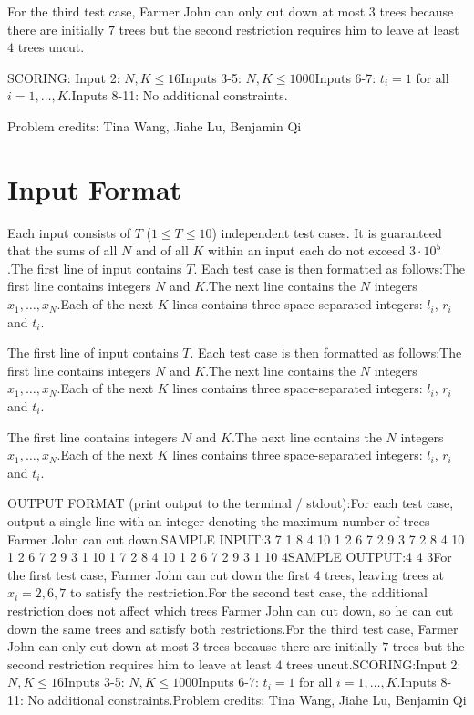 \documentclass[12pt]{article}
\begin{document}
For the third test case, Farmer John can only cut down at most $3$ trees because
there are initially $7$ trees but the second restriction requires him to leave
at least $4$ trees uncut.

SCORING:
Input 2: $N, K \le 16$Inputs 3-5: $N, K \le 1000$Inputs 6-7: $t_i = 1$ for all $i = 1, \dots, K$.Inputs 8-11: No additional constraints.


Problem credits: Tina Wang, Jiahe Lu, Benjamin Qi



\section*{Input Format}
Each input consists of $T$ ($1 \le T \le 10$) independent test cases. It is
guaranteed that the sums of all $N$ and of all $K$ within an input each do not
exceed $3 \cdot 10^5$.The first line of input contains $T$. Each test case is then formatted as
follows:The first line contains integers $N$ and $K$.The next line
contains the $N$ integers $x_1, \dots, x_N$.Each of the next $K$ lines
contains three space-separated integers: $l_i$, $r_i$ and $t_i$.

The first line of input contains $T$. Each test case is then formatted as
follows:The first line contains integers $N$ and $K$.The next line
contains the $N$ integers $x_1, \dots, x_N$.Each of the next $K$ lines
contains three space-separated integers: $l_i$, $r_i$ and $t_i$.

The first line contains integers $N$ and $K$.The next line
contains the $N$ integers $x_1, \dots, x_N$.Each of the next $K$ lines
contains three space-separated integers: $l_i$, $r_i$ and $t_i$.

OUTPUT FORMAT (print output to the terminal / stdout):For each test case, output a single line with an integer denoting the maximum
number of trees Farmer John can cut down.SAMPLE INPUT:3
7 1
8 4 10 1 2 6 7
2 9 3
7 2
8 4 10 1 2 6 7
2 9 3
1 10 1
7 2
8 4 10 1 2 6 7
2 9 3
1 10 4SAMPLE OUTPUT:4
4
3For the first test case, Farmer John can cut down the first $4$ trees, leaving
trees at $x_i = 2, 6, 7$ to satisfy the restriction.For the second test case, the additional restriction does not affect which trees
Farmer John can cut down, so he can cut down the same trees and satisfy both
restrictions.For the third test case, Farmer John can only cut down at most $3$ trees because
there are initially $7$ trees but the second restriction requires him to leave
at least $4$ trees uncut.SCORING:Input 2: $N, K \le 16$Inputs 3-5: $N, K \le 1000$Inputs 6-7: $t_i = 1$ for all $i = 1, \dots, K$.Inputs 8-11: No additional constraints.Problem credits: Tina Wang, Jiahe Lu, Benjamin Qi
\end{document}
